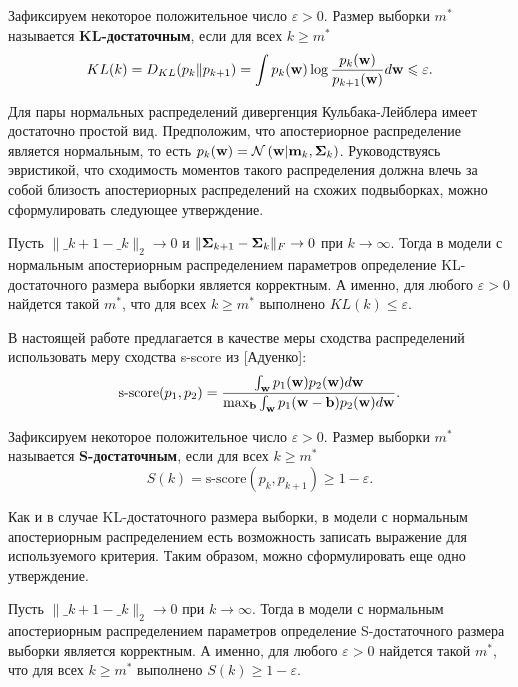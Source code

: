 \begin{definition}
    Зафиксируем некоторое положительное число $\varepsilon > 0$. Размер выборки $m^*$ называется \textbf{KL-достаточным}, если для всех $k \geqslant m^*$
    \[ KL(k) = D_{KL}(p_k \| p_{k+1}) = \int p_k(\mathbf{w}) \log{\dfrac{p_k(\mathbf{w})}{p_{k+1}(\mathbf{w})}} d\mathbf{w} \leqslant \varepsilon. \]
\end{definition}

Для пары нормальных распределений дивергенция Кульбака-Лейблера имеет достаточно простой вид. Предположим, что апостериорное распределение является нормальным, то есть $p_k(\mathbf{w}) = \mathcal{N}\left( \mathbf{w} | \mathbf{m}_k, \boldsymbol{\Sigma}_k \right)$. Руководствуясь эвристикой, что сходимость моментов такого распределения должна влечь за собой близость апостериорных распределений на схожих подвыборках, можно сформулировать следующее утверждение.

\begin{theorem}[Киселев, 2024]\label{theorem2}
    Пусть $\| \bm_{k+1} - \bm_k \|_2 \to 0$ и $\| \boldsymbol{\Sigma}_{k+1} - \boldsymbol{\Sigma}_k \|_{F} \to 0$ при $k \to \infty$. Тогда в модели с нормальным апостериорным распределением параметров определение KL-достаточного размера выборки является корректным. А именно, для любого $\varepsilon > 0$ найдется такой $m^*$, что для всех $k \geqslant m^*$ выполнено $KL(k) \leqslant \varepsilon$.
\end{theorem}

В настоящей работе предлагается в качестве меры сходства распределений использовать меру сходства s-score из [Адуенко]:
\[ \text{s-score}(p_1, p_2) = \dfrac{\int_{\mathbf{w}} p_1(\mathbf{w}) p_2(\mathbf{w}) d\mathbf{w}}{\max_{\mathbf{b}} \int_{\mathbf{w}} p_1(\mathbf{w} - \mathbf{b}) p_2(\mathbf{w}) d\mathbf{w}}. \]

\begin{definition}
    Зафиксируем некоторое положительное число $\varepsilon > 0$. Размер выборки $m^*$ называется \textbf{S-достаточным}, если для всех $k \geqslant m^*$
    \[ S(k) = \text{s-score}(p_k, p_{k+1}) \geqslant 1-\varepsilon. \]
\end{definition}

Как и в случае KL-достаточного размера выборки, в модели с нормальным апостериорным распределением есть возможность записать выражение для используемого критерия. Таким образом, можно сформулировать еще одно утверждение.

\begin{theorem}[Киселев, 2024]\label{theorem3}
    Пусть $\| \bm_{k+1} - \bm_k \|_2 \to 0$ при $k \to \infty$. Тогда в модели с нормальным апостериорным распределением параметров определение S-достаточного размера выборки является корректным. А именно, для любого $\varepsilon > 0$ найдется такой $m^*$, что для всех $k \geqslant m^*$ выполнено $S(k) \geqslant 1-\varepsilon$.
\end{theorem}

